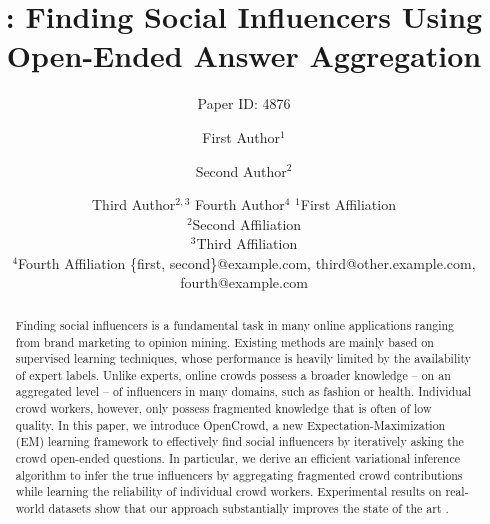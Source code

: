 \documentclass{article}
\title{\sys: Finding Social Influencers Using \pcm{[Leveraging?]} Open-Ended Answer \pcm{[Answers?]} Aggregation}
\author{
Paper ID: 4876
}
\author{
First Author$^1$
\and
Second Author$^2$\and
Third Author$^{2,3}$\And
Fourth Author$^4$
\affiliations
$^1$First Affiliation\\
$^2$Second Affiliation\\
$^3$Third Affiliation\\
$^4$Fourth Affiliation
\emails
\{first, second\}@example.com,
third@other.example.com,
fourth@example.com
}
\newcommand{\sys}{OpenCrowd\xspace}
\begin{document}
\maketitle

\begin{abstract}
Finding social influencers is a fundamental task in many online applications ranging from brand marketing to opinion mining. Existing methods are mainly based on supervised learning techniques, whose performance is heavily limited by the availability of expert labels. Unlike experts, online crowds possess a  broader knowledge -- on an aggregated level -- of influencers in many domains, such as fashion or health. Individual crowd workers, however, only possess fragmented knowledge that is often of low quality. In this paper, we introduce \sys, a new Expectation-Maximization (EM) learning framework to effectively find social influencers by iteratively asking the crowd open-ended questions. In particular, we derive an efficient variational inference algorithm to infer the true influencers by aggregating fragmented crowd contributions while learning the reliability of individual crowd workers. Experimental results on real-world datasets show that our approach substantially improves the state of the art .
\end{abstract}





\label{sec:intro}


\label{sec:problem}


\label{sec:method}


\label{sec:result}


\label{sec:related}


\label{sec:conclusion}









\end{document}
